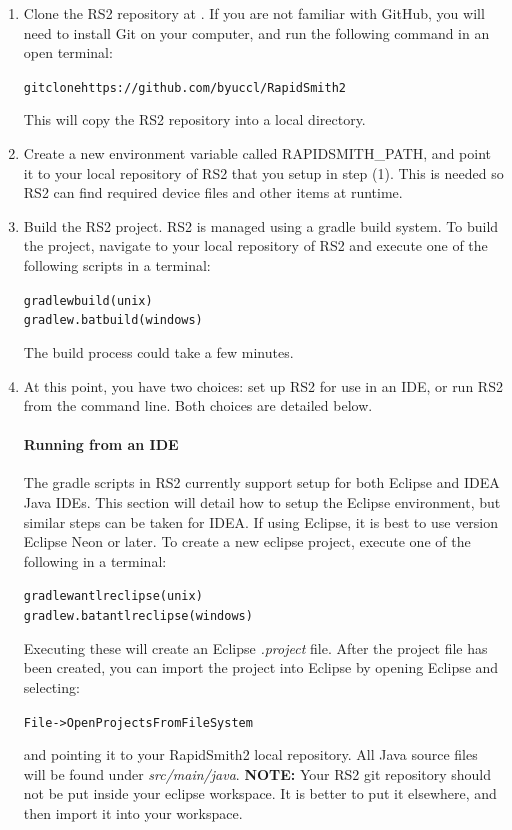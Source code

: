 \documentclass[10pt]{article}
\newcommand{\fil}[1]{{\em #1}}
\newcommand{\pgm}[1]{{\textbf{#1}}}
\newcommand{\dir}[1]{{\em #1}}
\newenvironment{code}{\begin{center} \begin{minipage}{6in} \noindent \begin{alltt}}{\end{alltt} \end{minipage} \end{center}}
\begin{document}
\begin{enumerate}
  \item Clone the RS2 repository at
  {}. If you are not
  familiar with GitHub, you will need to install Git on your computer, and run the
  following command in an open terminal: 
  \begin{code}
  git clone https://github.com/byuccl/RapidSmith2
  \end{code} 
  \noindent This will copy the RS2 repository into a local directory.
  \item Create a new environment variable called RAPIDSMITH\_PATH, and point it
  to your local repository of RS2 that you setup in step (1). This is needed so
  RS2 can find required device files and other items at runtime.
  \item Build the  RS2 project. RS2 is managed using a gradle build system.
  To build the project, navigate to your local repository of RS2 and execute one
  of the following scripts in a terminal:
  \begin{code}
	gradlew build (unix)
	gradlew.bat build (windows)
  \end{code}
  The build process could take a few minutes.
  \item At this point, you have two choices: set up RS2 for use in an IDE, or
  run RS2 from the command line. Both choices are detailed below.
  \paragraph{Running from an IDE} The gradle scripts in RS2 currently support
  setup for both Eclipse and IDEA Java IDEs. This section will detail how to
  setup the Eclipse environment, but similar steps can be taken for IDEA. If
  using Eclipse, it is best to use version Eclipse Neon or later. To create a
  new eclipse project, execute one of the following in a terminal:
  \begin{code}
	gradlew antlr eclipse (unix)       
	gradlew.bat antlr eclipse (windows)
  \end{code}
  Executing these will create an Eclipse \fil{.project} file. After the project
  file has been created, you can import the project into Eclipse by opening
  Eclipse and selecting:
  \begin{code}
	File->Open Projects From File System 
  \end{code}
  and pointing it to your RapidSmith2 local repository. All Java source files
  will be found under \dir{src/main/java}. \pgm{NOTE:} Your RS2 git repository
  should not be put inside your eclipse workspace. It is better to put it
  elsewhere, and then import it into your workspace.

\end{enumerate}
\end{document}
